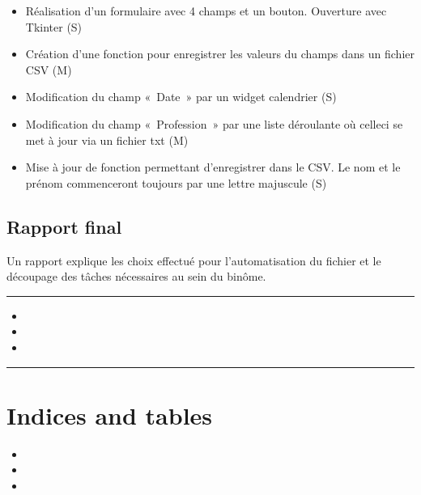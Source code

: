 \documentclass[letterpaper,10pt,french]{sphinxmanual}
\begin{document}
\sphinxAtStartPar
{}
\begin{itemize}
\item {} 
\sphinxAtStartPar
Réalisation d’un formulaire avec 4 champs et un bouton. Ouverture avec Tkinter (S)

\item {} 
\sphinxAtStartPar
Création d’une fonction pour enregistrer les valeurs du champs dans un fichier CSV (M)

\item {} 
\sphinxAtStartPar
Modification du champ « Date » par un widget calendrier (S)

\item {} 
\sphinxAtStartPar
Modification du champ « Profession » par une liste déroulante où celle\sphinxhyphen{}ci se met à jour via un fichier txt (M)

\item {} 
\sphinxAtStartPar
Mise à jour de fonction permettant d’enregistrer dans le CSV. Le nom et le prénom commenceront toujours par une lettre majuscule (S)

\end{itemize}

\sphinxstepscope


\section{Rapport final}
\label{\detokenize{Rapport:rapport-final}}\label{\detokenize{Rapport::doc}}
\sphinxAtStartPar
Un rapport explique les choix effectué pour l’automatisation du fichier et le découpage des tâches nécessaires au sein du binôme.


\bigskip\hrule\bigskip

\begin{itemize}
\item {} 
\sphinxAtStartPar


\item {} 
\sphinxAtStartPar


\item {} 
\sphinxAtStartPar


\end{itemize}


\bigskip\hrule\bigskip



\chapter{Indices and tables}
\label{\detokenize{index:indices-and-tables}}\begin{itemize}
\item {} 
\sphinxAtStartPar
{}

\item {} 
\sphinxAtStartPar
{}

\item {} 
\sphinxAtStartPar
{}

\end{itemize}



\renewcommand{\indexname}{Index}
\printindex
\end{document}

